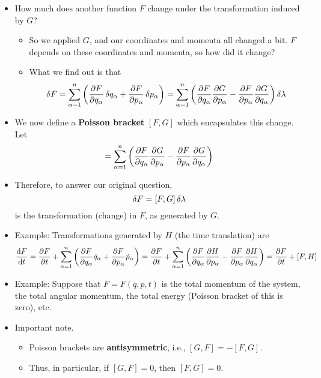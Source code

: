 \documentclass[../notes.tex]{subfiles}
\begin{document}
\begin{itemize}
    \item How much does another function $F$ change under the transformation induced by $G$?
    \begin{itemize}
        \item So we applied $G$, and our coordinates and momenta all changed a bit. $F$ depends on these coordinates and momenta, so how did it change?
        \item What we find out is that
        \begin{equation*}
            \var{F} = \sum_{\alpha=1}^n\left( \pdv{F}{q_\alpha}\var{q_\alpha}+\pdv{F}{p_\alpha}\var{p_\alpha} \right)
            = \sum_{\alpha=1}^n\left( \pdv{F}{q_\alpha}\pdv{G}{p_\alpha}-\pdv{F}{p_\alpha}\pdv{G}{q_\alpha} \right)\var{\lambda}
        \end{equation*}
    \end{itemize}
    \item We now define a \textbf{Poisson bracket} $[F,G]$ which encapsulates this change. Let
    \begin{equation*}
        [F,G] = \sum_{\alpha=1}^n\left( \pdv{F}{q_\alpha}\pdv{G}{p_\alpha}-\pdv{F}{p_\alpha}\pdv{G}{q_\alpha} \right)
    \end{equation*}
    \item Therefore, to answer our original question,
    \begin{equation*}
        \var{F} = [F,G]\var{\lambda}
    \end{equation*}
    is the transformation (change) in $F$, as generated by $G$.
    \item Example: Transformations generated by $H$ (the time translation) are
    \begin{equation*}
        \dv{F}{t} = \pdv{F}{t}+\sum_{\alpha=1}^n\left( \pdv{F}{q_\alpha}\dot{q}_\alpha+\pdv{F}{p_\alpha}\dot{p}_\alpha \right)
        = \pdv{F}{t}+\sum_{\alpha=1}^n\left( \pdv{F}{q_\alpha}\pdv{H}{p_\alpha}-\pdv{F}{p_\alpha}\pdv{H}{q_\alpha} \right)
        = \pdv{F}{t}+[F,H]
    \end{equation*}
    \item Example: Suppose that $F=F(q,p,t)$ is the total momentum of the system, the total angular momentum, the total energy (Poisson bracket of this is zero), etc.
    \item Important note.
    \begin{itemize}
        \item Poisson brackets are \textbf{antisymmetric}, i.e., $[G,F]=-[F,G]$.
        \item Thus, in particular, if $[G,F]=0$, then $[F,G]=0$.

\end{itemize}
\end{itemize}
\end{document}
